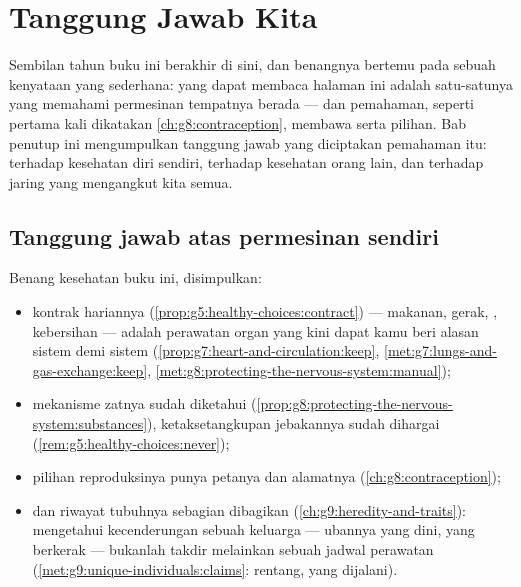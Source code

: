 \chapter{Tanggung Jawab Kita}\label{ch:g9:our-responsibility}

Sembilan tahun buku ini berakhir di sini, dan benangnya
bertemu pada sebuah kenyataan yang sederhana:  yang
dapat membaca halaman ini adalah satu-satunya  yang
memahami permesinan tempatnya berada --- dan pemahaman,
seperti pertama kali dikatakan \cref{ch:g8:contraception},
membawa serta pilihan. Bab penutup ini mengumpulkan tanggung
jawab yang diciptakan pemahaman itu: terhadap kesehatan diri
sendiri, terhadap kesehatan orang lain, dan terhadap jaring
 yang mengangkut kita semua.

\section{Tanggung jawab atas permesinan sendiri}

\begin{proposition}\label{prop:g9:our-responsibility:self}
Benang kesehatan buku ini, disimpulkan:
\begin{itemize}
  \item kontrak hariannya
        (\cref{prop:g5:healthy-choices:contract}) ---
        makanan, gerak, , kebersihan --- adalah
        perawatan organ yang kini dapat kamu beri alasan
        sistem demi sistem
        (\cref{prop:g7:heart-and-circulation:keep},
        \cref{met:g7:lungs-and-gas-exchange:keep},
        \cref{met:g8:protecting-the-nervous-system:manual});
  \item mekanisme zatnya sudah diketahui
        (\cref{prop:g8:protecting-the-nervous-system:substances}),
        ketaksetangkupan jebakannya sudah dihargai
        (\cref{rem:g5:healthy-choices:never});
  \item pilihan reproduksinya punya petanya dan alamatnya
        (\cref{ch:g8:contraception});
  \item dan riwayat tubuhnya sebagian dibagikan
        (\cref{ch:g9:heredity-and-traits}): mengetahui
        kecenderungan sebuah keluarga --- ubannya yang dini,
         yang berkerak --- bukanlah takdir
        melainkan sebuah jadwal perawatan
        (\cref{met:g9:unique-individuals:claims}: rentang,
        yang dijalani).
\end{itemize}
\end{proposition}
\admitted

